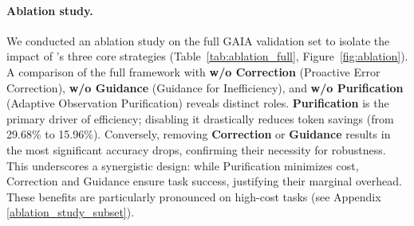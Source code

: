 \paragraph{Ablation study.} We conducted an ablation study on the full GAIA validation set to isolate the impact of \method's three core strategies (Table~\ref{tab:ablation_full}, Figure~\ref{fig:ablation}). A comparison of the full framework with \textbf{w/o Correction} (Proactive Error Correction), \textbf{w/o Guidance} (Guidance for Inefficiency), and \textbf{w/o Purification} (Adaptive Observation Purification) reveals distinct roles. \textbf{Purification} is the primary driver of efficiency; disabling it drastically reduces token savings (from 29.68\% to 15.96\%). Conversely, removing \textbf{Correction} or \textbf{Guidance} results in the most significant accuracy drops, confirming their necessity for robustness. This underscores a synergistic design: while Purification minimizes cost, Correction and Guidance ensure task success, justifying their marginal overhead. These benefits are particularly pronounced on high-cost tasks (see Appendix \ref{ablation_study_subset}).

